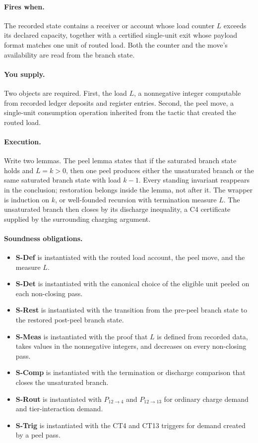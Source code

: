 \documentclass[
  11pt,
]{article}
\providecommand{\tightlist}{%
  \setlength{\itemsep}{0pt}\setlength{\parskip}{0pt}}
\theoremstyle{definition}
\newcommand{\ctpar}[1]{\paragraph{#1.}}
\begin{document}
\ctpar{Fires when}
The recorded state contains a receiver or account whose load counter
\(L\) exceeds its declared capacity, together with a certified
single-unit exit whose payload format matches one unit of routed load.
Both the counter and the move's availability are read from the branch
state.

\ctpar{You supply}
Two objects are required.  First, the load \(L\), a nonnegative integer
computable from recorded ledger deposits and register entries.  Second,
the peel move, a single-unit consumption operation inherited from the
tactic that created the routed load.

\ctpar{Execution}
Write two lemmas.  The peel lemma states that if the saturated branch
state holds and \(L=k>0\), then one peel produces either the unsaturated
branch or the same saturated branch state with load \(k-1\).  Every
standing invariant reappears in the conclusion; restoration belongs
inside the lemma, not after it.  The wrapper is induction on \(k\), or
well-founded recursion with termination measure \(L\).  The unsaturated
branch then closes by its discharge inequality, a C4 certificate supplied
by the surrounding charging argument.

\ctpar{Soundness obligations}
\begin{itemize}
\tightlist
\item \textbf{S-Def} is instantiated with the routed load account, the peel move, and the measure \(L\).
\item \textbf{S-Det} is instantiated with the canonical choice of the eligible unit peeled on each non-closing pass.
\item \textbf{S-Rest} is instantiated with the transition from the pre-peel branch state to the restored post-peel branch state.
\item \textbf{S-Meas} is instantiated with the proof that \(L\) is defined from recorded data, takes values in the nonnegative integers, and decreases on every non-closing pass.
\item \textbf{S-Comp} is instantiated with the termination or discharge comparison that closes the unsaturated branch.
\item \textbf{S-Rout} is instantiated with \(P_{12\to4}\) and \(P_{12\to13}\) for ordinary charge demand and tier-interaction demand.
\item \textbf{S-Trig} is instantiated with the CT4 and CT13 triggers for demand created by a peel pass.
\end{itemize}
\end{document}
